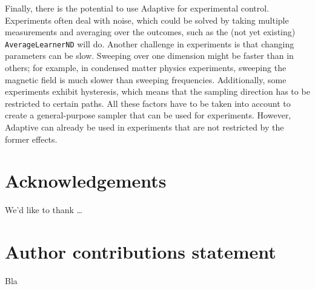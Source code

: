 \documentclass[english, twocolumn, 10pt, aps, superscriptaddress, floatfix, prb, citeautoscript]{revtex4-1}
\newcommand{\passthrough}[1]{\lstset{mathescape=false}#1\lstset{mathescape=true}}
\begin{document}
Finally, there is the potential to use Adaptive for experimental control.
Experiments often deal with noise, which could be solved by taking multiple measurements and averaging over the outcomes, such as the (not yet existing) \passthrough{\lstinline!AverageLearnerND!} will do.
Another challenge in experiments is that changing parameters can be slow.
Sweeping over one dimension might be faster than in others; for example, in condensed matter physics experiments, sweeping the magnetic field is much slower than sweeping frequencies.
Additionally, some experiments exhibit hysteresis, which means that the sampling direction has to be restricted to certain paths.
All these factors have to be taken into account to create a general-purpose sampler that can be used for experiments.
However, Adaptive can already be used in experiments that are not restricted by the former effects.

\section*{Acknowledgements}
We'd like to thank \ldots{}

\section*{Author contributions statement}
Bla




\end{document}
